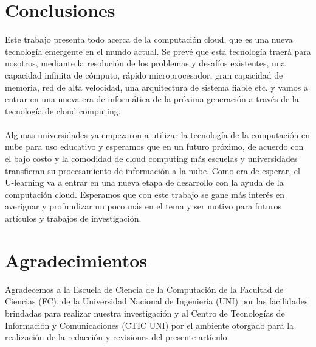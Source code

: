 \documentclass[journal]{IEEEtran}
\begin{document}
\section{Conclusiones}
Este trabajo presenta todo acerca de la computación cloud, que es una nueva tecnología emergente en el mundo actual. Se prevé que esta tecnología traerá para nosotros, mediante la resolución de los problemas y desafíos existentes, una capacidad infinita de cómputo, rápido microprocesador, gran capacidad de memoria, red de alta velocidad, una arquitectura de sistema fiable etc. y vamos a entrar en una nueva era de informática de la próxima generación a través de la tecnología de cloud computing.\\ \\
Algunas universidades ya empezaron a utilizar la tecnología de la computación en nube para uso educativo y esperamos que en un futuro próximo, de acuerdo con el bajo costo y la comodidad de cloud computing más escuelas y universidades transfieran su procesamiento de información a la nube. Como era de esperar, el U-learning va a entrar en una nueva etapa de desarrollo con la ayuda de la computación cloud. Esperamos que con este trabajo se gane más interés en averiguar y profundizar un poco más en el tema y ser motivo para futuros artículos y trabajos de investigación.


\section*{Agradecimientos}
Agradecemos a la Escuela de Ciencia de la Computación de la Facultad de Ciencias (FC), de la Universidad Nacional de Ingeniería (UNI) por las facilidades brindadas para realizar nuestra investigación y al Centro de Tecnologías de Información y Comunicaciones (CTIC UNI) por el ambiente otorgado para la realización de la redacción y revisiones del presente artículo.


\ifCLASSOPTIONcaptionsoff
  \newpage
\fi
\end{document}
